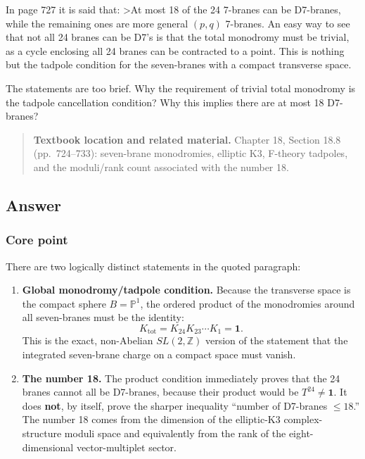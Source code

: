 \documentclass[
  10pt,
  a4paper,
  openany]{book}
\begin{document}
In page 727 it is said that: \textgreater At most 18 of the 24 7-branes
can be D7-branes, while the remaining ones are more general \((p,q)\)
7-branes. An easy way to see that not all 24 branes can be D7's is that
the total monodromy must be trivial, as a cycle enclosing all 24 branes
can be contracted to a point. This is nothing but the tadpole condition
for the seven-branes with a compact transverse space.

The statements are too brief. Why the requirement of trivial total
monodromy is the tadpole cancellation condition? Why this implies there
are at most 18 D7-branes?

\begin{quote}
\textbf{Textbook location and related material.} Chapter 18, Section
18.8 (pp.~724--733): seven-brane monodromies, elliptic K3, F-theory
tadpoles, and the moduli/rank count associated with the number 18.
\end{quote}

\subsection{Answer}\label{answer-42}

\subsubsection{Core point}\label{core-point-42}

There are two logically distinct statements in the quoted paragraph:

\begin{enumerate}
\def\labelenumi{\arabic{enumi}.}
\item
  \textbf{Global monodromy/tadpole condition.} Because the transverse
  space is the compact sphere \(B=\mathbb P^1\), the ordered product of
  the monodromies around all seven-branes must be the identity: \[
  \boxed{
  K_{\mathrm{tot}}
  =K_{24}K_{23}\cdots K_1
  =\mathbf1
  }.
  \] This is the exact, non-Abelian \(SL(2,\mathbb Z)\) version of the
  statement that the integrated seven-brane charge on a compact space
  must vanish.
\item
  \textbf{The number 18.} The product condition immediately proves that
  the 24 branes cannot all be D7-branes, because their product would be
  \(T^{24}\neq\mathbf1\). It does \textbf{not}, by itself, prove the
  sharper inequality ``number of D7-branes \(\leq18\).'' The number 18
  comes from the dimension of the elliptic-K3 complex-structure moduli
  space and equivalently from the rank of the eight-dimensional
  vector-multiplet sector.
\end{enumerate}
\end{document}

